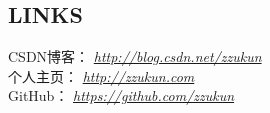 \documentclass[line, margin]{res}
\begin{document}
\begin{resume}
\vspace {30pt}
\section {LINKS}
{ CSDN博客：} {\sl \url{http://blog.csdn.net/zzukun}}\\
[3pt]
{ 个人主页：} {\sl \url{http://zzukun.com}}\\
[3pt]
{ GitHub： } {\sl \url{https://github.com/zzukun}}\\

\end{resume}
\end{document}
